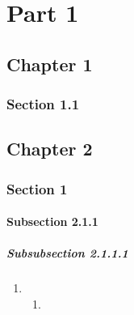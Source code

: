 \documentclass{book}
\begin{document}
\part{Part 1}
\label{part:part-1}

\setcounter{chapter}{12}

\chapter{Chapter 1}
\label{cha:chapter-1}


\section{Section 1.1}
\label{sec:section-1-1}

\chapter{Chapter 2}
\label{cha:chapter-2}

\section{Section 1}
\label{sec:section-2-1}

\subsection{Subsection 2.1.1}
\label{sec:subsection-2.1.1}

\subsubsection{Subsubsection 2.1.1.1}
\label{sec:subs-2.1.1.1}



\begin{enumerate}
\item {}
  \begin{enumerate}
  \item {}
  \end{enumerate}
\end{enumerate}
\end{document}
